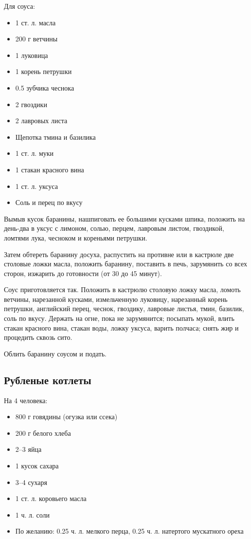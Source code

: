 Для соуса: 
\begin{itemize}
	\item  1 ст. л. масла 
    \item 200 г ветчины 
    \item 1 луковица 
    \item 1 корень петрушки
    \item 0.5 зубчика чеснока
    \item 2 гвоздики 
    \item 2 лавровых листа
    \item Щепотка тмина и базилика
    \item 1 ст. л. муки 
    \item 1 стакан красного вина 
    \item 1 ст. л. уксуса 
    \item Соль и перец по вкусу
\end{itemize}

Вымыв кусок баранины, нашпиговать ее большими кусками шпика, положить на день-два в уксус с лимоном, солью, перцем, лавровым листом, гвоздикой, ломтями лука, чесноком и кореньями петрушки.

Затем обтереть баранину досуха, распустить на противне или в кастрюле две столовые ложки масла, положить баранину, поставить в печь, зарумянить со всех сторон, изжарить до готовности (от 30 до 45 минут).

Соус приготовляется так. Положить в кастрюлю столовую ложку масла, ломоть ветчины, нарезанной кусками, измельченную луковицу, нарезанный корень петрушки, английский перец, чеснок, гвоздику, лавровые листья, тмин, базилик, соль по вкусу. Держать на огне, пока не зарумянится; посыпать мукой, влить стакан красного вина, стакан воды, ложку уксуса, варить полчаса; снять жир и процедить сквозь сито.

Облить баранину соусом и подать.

\subsection{Рубленые котлеты}

На 4 человека:

\begin{itemize} 
	\item  800 г говядины (огузка или ссека) 
    \item 200 г белого хлеба 
    \item 2–3 яйца 
    \item 1 кусок сахара
    \item 3–4 сухаря
    \item 1 ст. л. коровьего масла
    \item 1 ч. л. соли 
    \item По желанию: 0.25 ч. л. мелкого перца, 0.25 ч. л. натертого мускатного ореха
\end{itemize}

